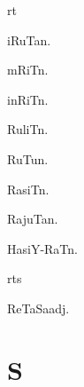 \begin{multicols*}{2}
\begin{dictroot}{r}{t}
\begin{dictentry}{iRuTa}{n.}
    \end{dictentry}
    \begin{dictentry}{mRiT}{n.}
    \end{dictentry}
    \begin{dictentry}{inRiT}{n.}
    \end{dictentry}
    \begin{dictentry}{RuliT}{n.}
    \end{dictentry}
    \begin{dictentry}{RuTu}{n.}
    \end{dictentry}
    \begin{dictentry}{RasiT}{n.}
    \end{dictentry}
    \begin{dictentry}{RajuTa}{n.}
    \end{dictentry}
    \begin{dictentry}{HasiY-RaT}{n.}\label{word:HasiY-RaT}
    \end{dictentry}
\end{dictroot}

\begin{dictroot}{rt}{s}
    \begin{dictentry}{ReTaSa}{adj.}
    \end{dictentry}
\end{dictroot}

\section*{S}


\end{multicols*}
